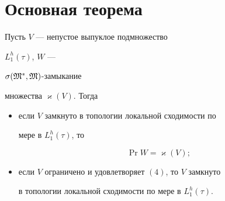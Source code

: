 \section{Основная теорема}





\begin{thmnonum} Пусть $V$ --- непустое выпуклое подмножество 


$L_1^h (\tau)$, $W$ --- 


$\sigma ({\frak M}^*, {\frak M})$-замыкание 


множества $\varkappa (V)$. Тогда


\begin{itemize}


\item[a)] если $V$ замкнуто в топологии локальной сходимости по 


мере в $L_1^h (\tau)$, то


\begin{equation}


\Pr W=\varkappa (V);


\end{equation}


\item[b)] если $V$ ограничено и удовлетворяет $(4)$, то $V$ замкнуто 


в топологии локальной сходимости по мере в $L_1^h (\tau)$.


\end{itemize}


\end{thmnonum}





